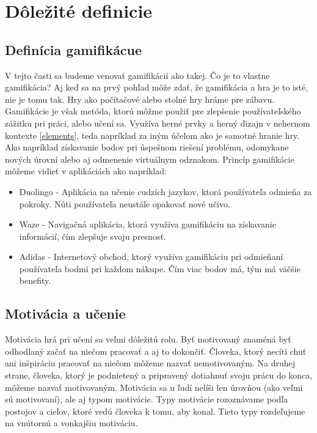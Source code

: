 \documentclass[10pt,oneside,slovak,a4paper]{article}
\begin{document}
\section{Dôležité definicie} \label{definicie}
\subsection{Definícia gamifikácue} \label{gamifikacia}
V tejto časti sa budeme venovať gamifikácií ako takej. Čo je to vlastne gamifikácia? Aj keď sa na prvý pohľad môže zdať, že gamifikácia a hra je to isté, nie je tomu tak. Hry ako počítačové alebo stolné hry hráme pre zábavu. Gamifikácie je však metóda, ktorú môžme použiť pre zlepšenie používateľského zážitku pri práci, alebo učení sa. Využíva herné prvky a herný dizajn v nehernom kontexte \ref{elements}, teda napríklad za iným účelom ako je samotné hranie hry. Ako napríklad získavanie bodov pri úspešnom riešení problému, odomykane nových úrovní alebo aj odmenenie virtuálnym odznakom. Princíp gamifikácie môžeme vidieť v aplikáciách ako napríklad:

\begin{itemize}
    \item Duolingo - Aplikácia na učenie cudzích jazykov, ktorá používateľa odmieňa za pokroky. Núti používateľa neustále opakovať nové učivo.
    \item Waze - Navigačná aplikácia, ktorá využíva gamifikáciu na získavanie informácií, čím zlepšuje svoju presnosť.
    \item Adidas - Internetový obchod, ktorý využíva gamifikáciu pri odmieňaní používateľa bodmi pri každom nákupe. Čím viac bodov má, tým má väčšie benefity.
\end{itemize}



\subsection{Motivácia a učenie} \label{motivacia}
Motivácia hrá pri učení sa veľmi dôležitú rolu. Byť motivovaný znaméná byť odhodlaný začať na niečom pracovať a aj to dokončiť. Človeka, ktorý necíti chuť ani inšpiráciu pracovať na niečom môžeme nazvať nemotivovaným. Na druhej strane, človeka, ktorý je podnietený a pripravený dotiahnuť svoju prácu do konca, môžeme nazvať motivovaným. Motivácia sa u ľudí nelíši len úrovňou (ako veľmi sú motivovaní), ale aj typom motivácie. Typy motivácie rozoznávame podľa postojov a cieľov, ktoré vedú človeka k tomu, aby konal. Tieto typy rozdeľujeme na vnútornú a vonkajšiu motiváciu. ~\cite{ryan2000intrinsic}
\end{document}
